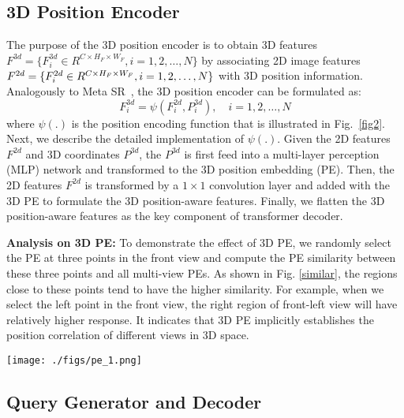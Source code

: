 \documentclass[runningheads]{llncs}
\begin{document}
\subsection{3D Position Encoder}
The purpose of the 3D position encoder is to obtain 3D features $F^{3d}=\{F^{3d}_i\in  R^{C \times H_F \times W_F}, i=1,2,\dots, N\}$ by associating 2D image features $F^{2d}=\{F^{2d}_i\in \\R^{C \times H_F \times W_F}, i=1,2,\dots, N\}$ with 3D position information. Analogously to Meta SR~\cite{hu2019metasr}, the 3D position encoder can be formulated as:
\begin{equation}\label{eq3}
F^{3d}_i = \psi(F^{2d}_i,P^{3d}_i), \quad i=1,2,\dots, N
\end{equation}
where $\psi(.)$ is the position encoding function that is illustrated in Fig.~\ref{fig2}. Next, we describe the detailed implementation of $\psi(.)$.
Given the 2D features $F^{2d}$ and 3D coordinates $P^{3d}$, the $P^{3d}$ is first feed into a multi-layer perception (MLP) network and transformed to the 3D position embedding (PE). Then, the 2D features $F^{2d}$ is transformed by a $1\times1$ convolution layer and added with the 3D PE to formulate the 3D position-aware features. Finally, we flatten the 3D position-aware features as the key component of transformer decoder. 


\noindent \textbf{Analysis on 3D PE:} To demonstrate the effect of 3D PE, we randomly select the PE at three points in the front view and compute the PE similarity between these three points and all multi-view PEs. As shown in Fig. \ref{similar}, the regions close to these points tend to have the higher similarity. For example, when we select the left point in the front view, the right region of front-left view will have relatively higher response. It indicates that 3D PE implicitly establishes the position correlation of different views in 3D space.

\begin{figure*}[t]
	\centering  
	\texttt{[image: ./figs/pe\_1.png]}  
	\caption{3D position embedding similarity. The red points are selected positions in the front view. We calculated the similarity between the position embedding of these selected positions and all image views. It shows that the regions close to these selective points tend to have  higher similarity.}
	\label{similar}
\end{figure*}

\subsection{Query Generator and Decoder}
\end{document}
